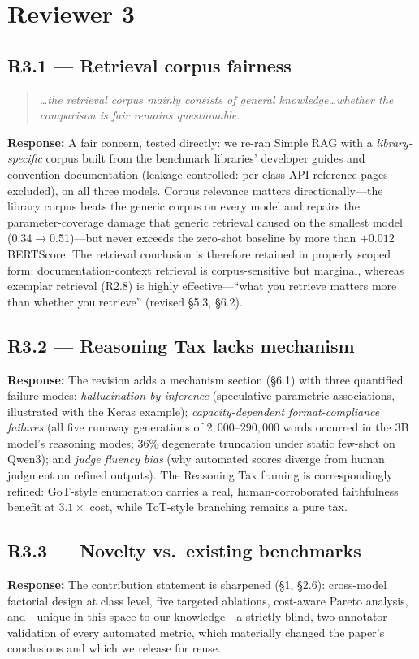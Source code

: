 \documentclass[11pt]{article}
\newcommand{\rcomment}[1]{\begin{quote}\itshape\color{black!70}#1\end{quote}}
\newcommand{\resp}{\noindent\textbf{Response:} }
\begin{document}
\section{Reviewer 3}

\subsection*{R3.1 --- Retrieval corpus fairness}
\rcomment{\dots the retrieval corpus mainly consists of general knowledge\dots whether the comparison is fair remains questionable.}
\resp A fair concern, tested directly: we re-ran Simple RAG with a \emph{library-specific} corpus built from the benchmark libraries' developer guides and convention documentation (leakage-controlled: per-class API reference pages excluded), on all three models. Corpus relevance matters directionally---the library corpus beats the generic corpus on every model and repairs the parameter-coverage damage that generic retrieval caused on the smallest model (0.34$\rightarrow$0.51)---but never exceeds the zero-shot baseline by more than $+0.012$ BERTScore. The retrieval conclusion is therefore retained in properly scoped form: documentation-context retrieval is corpus-sensitive but marginal, whereas exemplar retrieval (R2.8) is highly effective---``what you retrieve matters more than whether you retrieve'' (revised \S5.3, \S6.2).

\subsection*{R3.2 --- Reasoning Tax lacks mechanism}
\resp The revision adds a mechanism section (\S6.1) with three quantified failure modes: \emph{hallucination by inference} (speculative parametric associations, illustrated with the Keras example); \emph{capacity-dependent format-compliance failures} (all five runaway generations of $2{,}000$--$290{,}000$ words occurred in the 3B model's reasoning modes; 36\% degenerate truncation under static few-shot on Qwen3); and \emph{judge fluency bias} (why automated scores diverge from human judgment on refined outputs). The Reasoning Tax framing is correspondingly refined: GoT-style enumeration carries a real, human-corroborated faithfulness benefit at $3.1\times$ cost, while ToT-style branching remains a pure tax.

\subsection*{R3.3 --- Novelty vs.\ existing benchmarks}
\resp The contribution statement is sharpened (\S1, \S2.6): cross-model factorial design at class level, five targeted ablations, cost-aware Pareto analysis, and---unique in this space to our knowledge---a strictly blind, two-annotator validation of every automated metric, which materially changed the paper's conclusions and which we release for reuse.
\end{document}
